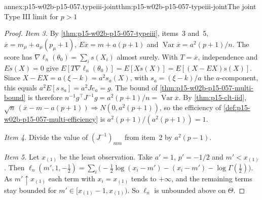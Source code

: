 \begin{annexitem}{annex:p15-w02b-p15-057.typeiii-joint}{thm:p15-w02b-p15-057-typeiii-joint}{The joint Type III limit for \(p>1\)}
\begin{proof}
\emph{Item 3.} By \cref{thm:p15-w02b-p15-057-typeiii}, items~3 and~5,
\(\overline x=m_\mu+a_\mu(p_\mu+1)\), \(E\overline x=m+a(p+1)\) and
\(\operatorname{Var}\overline x=a^2(p+1)/n\). The score has
\(\nabla\ell_n(\theta_0)=\sum_is(X_i)\) almost surely. With
\(T=\overline x\), independence and \(Es(X)=0\) give
\(E[T\nabla\ell_n(\theta_0)]=E[Xs(X)]=E[(X-EX)s(X)]\). Since
\(X-EX=a(\xi-k)=a^2s_a(X)\), with \(s_a=(\xi-k)/a\) the \(a\)-component,
this equals \(a^2E[s\,s_a]=a^2Je_a=g\). The bound of
\cref{thm:p15-w02b-p15-057-multi-bound} is therefore
\(n^{-1}g^{\top}J^{-1}g=a^2(p+1)/n=\operatorname{Var}\overline x\). By
\cref{thm:p15-clt-iid},
\(\sqrt n\,(\overline x-m-a(p+1))\Rightarrow N(0,a^2(p+1))\), so the
efficiency of \cref{def:p15-w02b-p15-057-multi-efficiency} is
\(a^2(p+1)/(a^2(p+1))=1\).

\emph{Item 4.} Divide the value of \((J^{-1})_{mm}\) from item~2 by
\(a^2(p-1)\).

\emph{Item 5.} Let \(x_{(1)}\) be the least observation. Take \(a'=1\),
\(p'=-1/2\) and \(m'<x_{(1)}\). Then
\(\ell_n(m',1,-\tfrac12)=\sum_i\bigl(-\tfrac12\log(x_i-m')-(x_i-m')
-\log\Gamma(\tfrac12)\bigr)\). As \(m'\uparrow x_{(1)}\) each term with
\(x_i=x_{(1)}\) tends to \(+\infty\), and the remaining terms stay bounded
for \(m'\in[x_{(1)}-1,x_{(1)})\). So \(\ell_n\) is unbounded above on
\(\Theta\).
\end{proof}
\end{annexitem}

